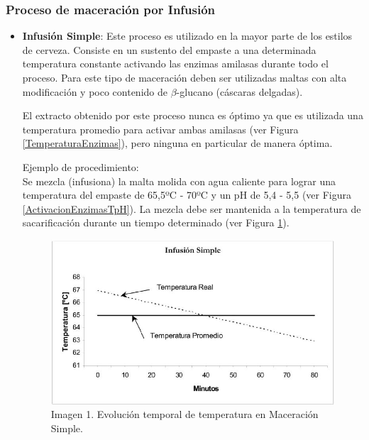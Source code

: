             \subsubsection{Proceso de maceración por Infusión}
                \begin{itemize}
                    \item \textbf{Infusión Simple}: Este proceso es utilizado en la mayor parte de los estilos de cerveza. Consiste en un sustento del empaste a una determinada temperatura constante activando las enzimas amilasas durante todo el proceso. Para este tipo de maceración deben ser utilizadas maltas con alta modificación y poco contenido de $\beta$-glucano (cáscaras delgadas).
                    
                    \par El extracto obtenido por este proceso nunca es óptimo ya que es utilizada una temperatura promedio para activar ambas amilasas (ver Figura \ref{TemperaturaEnzimas}), pero ninguna en particular de manera óptima.
                    
                    \par Ejemplo de procedimiento: \\ Se mezcla (infusiona) la malta molida con agua caliente para lograr una temperatura del empaste de 65,5ºC - 70ºC y un pH de 5,4 - 5,5 (ver Figura \ref{ActivacionEnzimasTpH}). La mezcla debe ser mantenida a la temperatura de sacarificación durante un tiempo determinado (ver Figura \ref{MaceracionSimple}).
                    
                    \begin{figure} [H]		                                                            \centerline{\includegraphics[scale=0.7]{maceracion_simple.jpg}}
                        \caption{Imagen 1. Evolución temporal de temperatura en Maceración Simple. \cite{Ceresvis}}
                        \label{MaceracionSimple}
                    \end{figure}
                    

\end{itemize}

